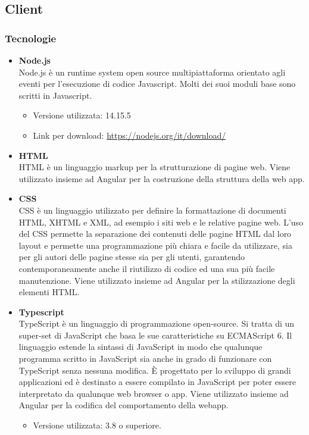\subsection{Client}

\subsubsection{Tecnologie}

\begin{itemize}
	\item \textbf{Node.js} \\
	Node.js è un runtime system open source multipiattaforma orientato agli eventi per l'esecuzione di codice Javascript. Molti dei suoi moduli base sono scritti in Javascript. 
	\begin{itemize}
		\item Versione utilizzata: 14.15.5
		\item Link per download: \url{https://nodejs.org/it/download/}
	\end{itemize}
	
	\item \textbf{HTML} \\
	HTML è un linguaggio markup per la strutturazione di pagine web. Viene utilizzato insieme ad Angular per la costruzione della struttura della web app.

	\item \textbf{CSS} \\
	CSS è un linguaggio utilizzato per definire la formattazione di documenti HTML, XHTML e XML, ad esempio i siti web e le relative pagine web. L'uso del CSS permette la separazione dei contenuti delle pagine HTML dal loro layout e permette una programmazione più chiara e facile da utilizzare, sia per gli autori delle pagine stesse sia per gli utenti, garantendo contemporaneamente anche il riutilizzo di codice ed una sua più facile manutenzione. Viene utilizzato insieme ad Angular per la stilizzazione degli elementi HTML.
	\item \textbf{Typescript}\\
	TypeScript è un linguaggio di programmazione open-source. Si tratta di un super-set di JavaScript che basa le sue caratteristiche su ECMAScript 6. Il linguaggio estende la sintassi di JavaScript in modo che qualunque programma scritto in JavaScript sia anche in grado di funzionare con TypeScript senza nessuna modifica. È progettato per lo sviluppo di grandi applicazioni ed è destinato a essere compilato in JavaScript per poter essere interpretato da qualunque web browser o app. Viene utilizzato insieme ad Angular per la codifica del comportamento della webapp.
	\begin{itemize}
		\item Versione utilizzata: 3.8 o superiore.
	\end{itemize}

\end{itemize}

